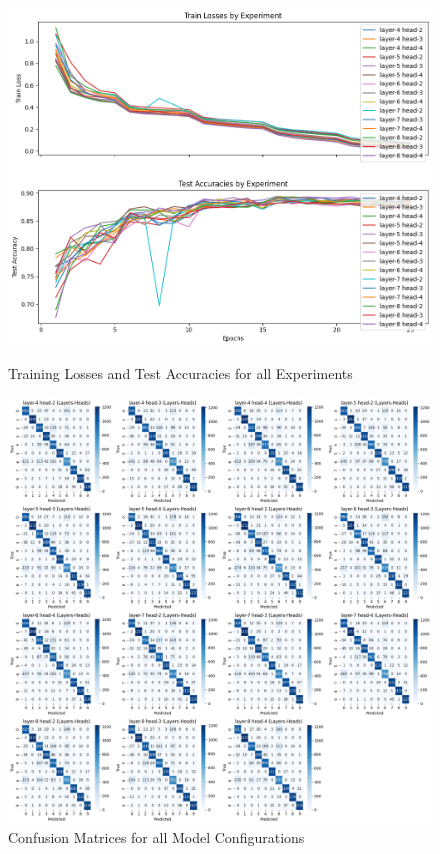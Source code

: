 \documentclass{article}
\begin{document}
\begin{figure}[ht]
    \centering
    \begin{minipage}{0.48\textwidth}
      \centering
      \includegraphics[width=\textwidth]{losses.png}
      \caption{Training Losses and Test Accuracies for all Experiments}
      \label{fig:train_test_loss}
    \end{minipage}\hfill
    \begin{minipage}{0.48\textwidth}
      \centering
      \includegraphics[width=\textwidth]{conf_mat.png}
      \caption{Confusion Matrices for all Model Configurations}
      \label{fig:confusion_matrix}
    \end{minipage}
  \end{figure}
\end{document}
